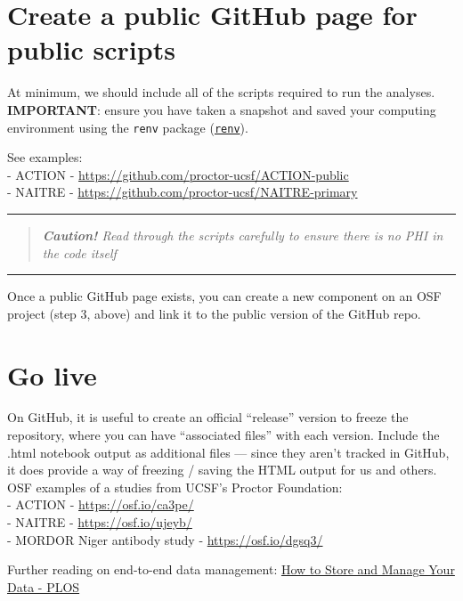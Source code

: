 \documentclass[
]{book}
\begin{document}
\section{Create a public GitHub page for public scripts}\label{create-a-public-github-page-for-public-scripts}

At minimum, we should include all of the scripts required to run the analyses. \textbf{IMPORTANT}: ensure you have taken a snapshot and saved your computing environment using the \texttt{renv} package (\hyperref[renv]{\texttt{renv}}).

See examples:\\
- ACTION - \url{https://github.com/proctor-ucsf/ACTION-public}\\
- NAITRE - \url{https://github.com/proctor-ucsf/NAITRE-primary}

\begin{center}\rule{0.5\linewidth}{0.5pt}\end{center}

\begin{quote}
\emph{\textbf{Caution!} Read through the scripts carefully to ensure there is no PHI in the code itself }
\end{quote}

\begin{center}\rule{0.5\linewidth}{0.5pt}\end{center}

Once a public GitHub page exists, you can create a new component on an OSF project (step 3, above) and link it to the public version of the GitHub repo.

\section{Go live}\label{go-live}

On GitHub, it is useful to create an official ``release'' version to freeze the repository, where you can have ``associated files'' with each version. Include the .html notebook output as additional files --- since they aren't tracked in GitHub, it does provide a way of freezing / saving the HTML output for us and others. OSF examples of a studies from UCSF's Proctor Foundation:\\
- ACTION - \url{https://osf.io/ca3pe/}\\
- NAITRE - \url{https://osf.io/ujeyb/}\\
- MORDOR Niger antibody study - \url{https://osf.io/dgsq3/}

Further reading on end-to-end data management: \href{https://plos.org/resource/how-to-store-and-manage-your-data/\#data-management-plan}{How to Store and Manage Your Data - PLOS}
\end{document}
